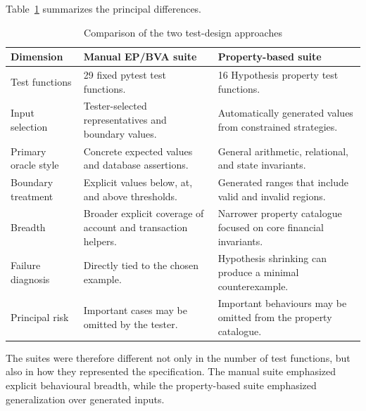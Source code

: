 \documentclass[12pt]{article}
\begin{document}
Table~\ref{tab:test-design-comparison} summarizes the principal differences.

\begin{table}[H]
\centering
\caption{Comparison of the two test-design approaches}
\label{tab:test-design-comparison}
\begin{tabular}{|p{4cm}|p{4.7cm}|p{4.7cm}|}
\hline
\textbf{Dimension} &
\textbf{Manual EP/BVA suite} &
\textbf{Property-based suite} \\
\hline

Test functions &
29 fixed pytest test functions. &
16 Hypothesis property test functions. \\
\hline

Input selection &
Tester-selected representatives and boundary values. &
Automatically generated values from constrained strategies. \\
\hline

Primary oracle style &
Concrete expected values and database assertions. &
General arithmetic, relational, and state invariants. \\
\hline

Boundary treatment &
Explicit values below, at, and above thresholds. &
Generated ranges that include valid and invalid regions. \\
\hline

Breadth &
Broader explicit coverage of account and transaction helpers. &
Narrower property catalogue focused on core financial invariants. \\
\hline

Failure diagnosis &
Directly tied to the chosen example. &
Hypothesis shrinking can produce a minimal counterexample. \\
\hline

Principal risk &
Important cases may be omitted by the tester. &
Important behaviours may be omitted from the property catalogue. \\
\hline

\end{tabular}
\end{table}

The suites were therefore different not only in the number of test functions,
but also in how they represented the specification. The manual suite emphasized
explicit behavioural breadth, while the property-based suite emphasized
generalization over generated inputs.

\end{document}
